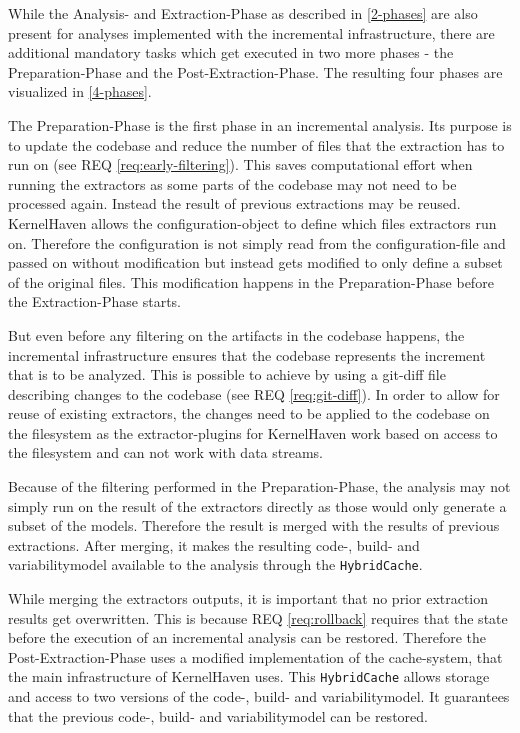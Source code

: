 \documentclass[a4paper]{article}
\begin{document}
While the Analysis- and Extraction-Phase as described in \autoref{2-phases} are also present for analyses implemented with the incremental infrastructure, there are additional mandatory tasks which get executed in two more phases - the Preparation-Phase and the Post-Extraction-Phase. The resulting four phases are visualized in \autoref{4-phases}.

The Preparation-Phase is the first phase in an incremental analysis. Its purpose is to update the codebase and reduce the number of files that the extraction has to run on (see REQ \ref{req:early-filtering}). This saves computational effort when running the extractors as some parts of the codebase  may not need to be processed again. Instead the result of previous extractions may be reused. KernelHaven allows the configuration-object to define which files extractors run on. Therefore the configuration is not simply read from the configuration-file and passed on without modification but instead gets modified to only define a subset of the original files. This modification happens in the Preparation-Phase before the Extraction-Phase starts.

 But even before any filtering on the artifacts in the codebase happens, the incremental infrastructure ensures that the codebase represents the increment that is to be analyzed. This is possible to achieve by using a git-diff file describing changes to the codebase (see REQ \ref{req:git-diff}). In order to allow for reuse of existing extractors, the changes need to be applied to the codebase on the filesystem as the extractor-plugins for KernelHaven work based on access to the filesystem and can not work with data streams.

Because of the filtering performed in the Preparation-Phase, the analysis may not simply run on the result of the extractors directly as those would only generate a subset of the models. Therefore the result is merged with the results of previous extractions. After merging, it makes the resulting code-, build- and variabilitymodel available to the analysis through the \texttt{HybridCache}.

While merging the extractors outputs, it is important that no prior extraction results get overwritten. This is because REQ \ref{req:rollback} requires that the state before the execution of an incremental analysis can be restored. Therefore the Post-Extraction-Phase uses a modified implementation of the cache-system, that the main infrastructure of KernelHaven uses. This \texttt{HybridCache} allows storage and access to two versions of the code-, build- and variabilitymodel. It guarantees that the previous code-, build- and variabilitymodel can be restored.
\end{document}
